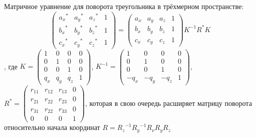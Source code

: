 \documentclass [12pt, a4paper] {article}
\begin{document}
Матричное уравнение для поворота треугольника в трёхмерном пространстве:
\begin {equation} \label{eq:rotate2} \nonumber
	\begin {pmatrix}
		{a_x}^* & {a_y}^* & {a_z}^* & 1 \\
		{b_x}^* & {b_y}^* & {b_z}^* & 1 \\
		{c_x}^* & {c_y}^* & {c_z}^* & 1
	\end {pmatrix} = \begin {pmatrix}
		a_x & a_y & a_z & 1 \\
		b_x & b_y & b_z & 1 \\
		c_x & c_y & c_z & 1
	\end {pmatrix} K^{-1} R^* K
\end {equation},
где $K = \begin {pmatrix}
	1 & 0 & 0 & 0 \\
	0 & 1 & 0 & 0 \\
	0 & 0 & 1 & 0 \\
	q_x & q_y & q_z & 1
\end {pmatrix}$, $K^{-1} = \begin {pmatrix}
	1 & 0 & 0 & 0 \\
	0 & 1 & 0 & 0 \\
	0 & 0 & 1 & 0 \\
	-q_x & -q_y & -q_z & 1
\end {pmatrix}$, $R^* = \begin {pmatrix}
	r_{11} & r_{12} & r_{13} & 0 \\
	r_{21} & r_{22} & r_{23} & 0 \\
	r_{31} & r_{22} & r_{33} & 0 \\
	0 & 0 & 0 & 1
\end {pmatrix}$, которая в свою очередь расширяет матрицу поворота относительно начала координат $R = {R_z}^{-1} {R_y}^{-1} R_\nu R_y R_z$
\end{document}
